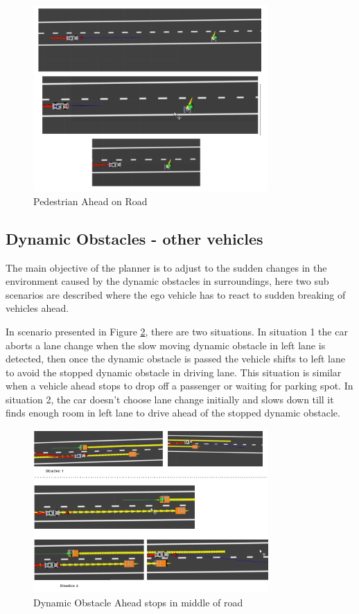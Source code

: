 \begin{figure}[h]
    \centering
    \includegraphics[width=0.8\textwidth]{Images/evaluation/pedestrian_ahead.jpg}
    \caption{Pedestrian Ahead on Road}
    \label{pedestrian_ahead}
\end{figure}

\subsection{Dynamic Obstacles - other vehicles}
The main objective of the planner is to adjust to the sudden changes in the environment caused by the dynamic obstacles in surroundings, here two sub scenarios are described where the ego vehicle has to react to sudden breaking of vehicles ahead. 

In scenario presented in Figure \ref{dynamic_1}, there are two situations. In situation 1 the car aborts a lane change when the slow moving dynamic obstacle in left lane is detected, then once the dynamic obstacle is passed the vehicle shifts to left lane to avoid the stopped dynamic obstacle in driving lane. This situation is similar when a vehicle ahead stops to drop off a passenger or waiting for parking spot. In situation 2, the car doesn't choose lane change initially and slows down till it finds enough room in left lane to drive ahead of the stopped dynamic obstacle. 

\begin{figure}[h]
    \centering
    \includegraphics[width=0.8\textwidth]{Images/evaluation/dynamic_ahead_breaking1.jpg}
    \caption{Dynamic Obstacle Ahead stops in middle of road}
    \label{dynamic_1}
\end{figure}

